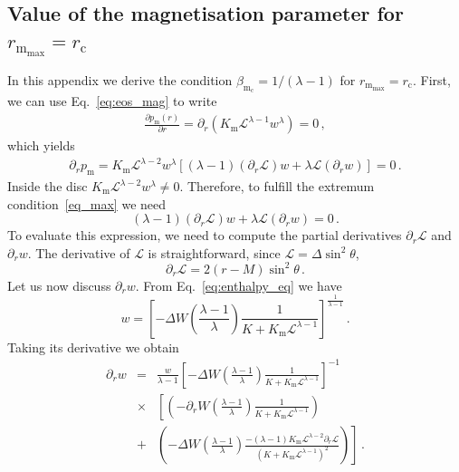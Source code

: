 \documentclass{aa}
\begin{document}
\begin{appendix}
\section{Value of the magnetisation parameter for $r_{\mathrm{m}_{\mathrm{max}}} = r_{\mathrm{c}}$}\label{app_magmax}
In this appendix we derive the condition $\beta_{\mathrm{m}_{\mathrm{c}}} = 1/(\lambda - 1)$ for $r_{\mathrm{m}_{\mathrm{max}}} = r_{\mathrm{c}}$.
First, we can use Eq.~\eqref{eq:eos_mag} to write 
\begin{eqnarray}\label{eq_max}
\frac{\partial{p_{\mathrm{m}}(r)}}{\partial r} = \partial_{r} \left(K_{\mathrm{m}} \mathcal{L}^{\lambda -1} w^{\lambda}\right) = 0\,,
\end{eqnarray}
which yields
\begin{eqnarray}
\partial_{r} p_{\mathrm{m}} = K_{\mathrm{m}} \mathcal{L}^{\lambda - 2}w^{\lambda} [(\lambda - 1)(\partial_r \mathcal{L}) w + \lambda \mathcal{L} (\partial_r w)]=0\,.
\end{eqnarray}
Inside the disc $K_{\mathrm{m}} \mathcal{L}^{\lambda - 2}w^{\lambda} \neq 0$. Therefore, to fulfill the extremum condition~\eqref{eq_max} we need 
\begin{equation}\label{eq:simple_expr}
(\lambda - 1)(\partial_r \mathcal{L}) w + \lambda \mathcal{L} (\partial_r w) = 0\,.
\end{equation}
To evaluate this expression, we need to compute the partial derivatives $\partial_r \mathcal{L}$ and $\partial_r w$. The derivative of $\mathcal{L}$ is straightforward, since $\mathcal{L} = \Delta \sin^2 \theta$,
\begin{equation}
\partial_r \mathcal{L} = 2(r-M)\sin^2 \theta\,.
\end{equation}
Let us now discuss $\partial_r w$. From Eq.~\eqref{eq:enthalpy_eq} we have
\begin{equation}
w = \left[-\Delta W \left(\frac{\lambda -1}{\lambda}\right)\frac{1}{K+K_{\mathrm{m}}\mathcal{L}^{\lambda - 1}}\right]^{\frac{1}{\lambda-1}}\,.
\end{equation}
Taking its derivative we obtain
\begin{eqnarray}
\partial_r w &=& \frac{w}{\lambda - 1} \left[-\Delta W \left(\frac{\lambda -1}{\lambda}\right)\frac{1}{K+K_{\mathrm{m}}\mathcal{L}^{\lambda - 1}}\right]^{-1} 
\nonumber \\
&\times&
\left[\left(-\partial_r W \left(\frac{\lambda -1 }{\lambda}\right) \frac{1}{K+K_{\mathrm{m}}\mathcal{L}^{\lambda - 1}}\right) 
\right.
\nonumber \\
&+& \left. \left(-\Delta W \left(\frac{\lambda -1}{\lambda}\right)\frac{-(\lambda - 1) K_{\mathrm{m}} \mathcal{L}^{\lambda - 2} \partial_r \mathcal{L}}{(K+K_{\mathrm{m}}\mathcal{L}^{\lambda - 1})^2}\right)\right]\,.

\end{eqnarray}
\end{appendix}
\end{document}
